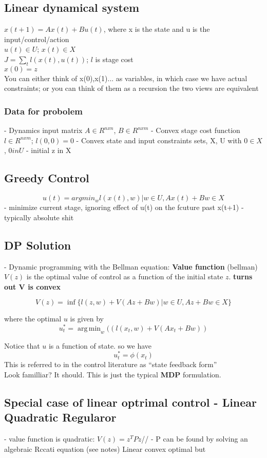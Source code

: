 \documentclass[11pt]{article}
\DeclareMathOperator*{\argmin}{arg\,min}
\begin{document}
\subsection{Linear dynamical system}
$x(t+1) = Ax(t) + Bu(t)$, where x is the state and u is the input/control/action\\
$u(t) \in U$; $x(t) \in X$\\
$J= \sum_{t} l(x(t), u(t))$; $l$ is stage cost\\
$x(0) = z$\\
You can either think of x(0),x(1)... as variables, in which case
we have actual constraints;
or you can think of them as a recursion
the two views are equivalent

\subsubsection{ Data for probolem}
- Dynamics input matrix $A \in R^{nxn}$, $B \in R^{nxm}$
- Convex stage cost function $l \in R^{nxm}$; $l(0,0)=0$
- Convex state and input constraints sets, X, U with $0\in X$, $0 in U$
- initial z in X

\subsection{ Greedy Control}
$$u(t) = argmin_w {l(x(t), w) | w \in U, Ax(t)+Bw \in X}$$
- minimize current stage, ignoring effect of u(t) on the fcuture past x(t+1)
- typically absolute shit

\subsection{DP Solution} - Dynamic programming with the Bellman equation:
\textbf{Value function} (bellman) $V(z)$ is the optimal value of control as a
function of the initial state $z$.
\textbf{turns out V is convex}

\[ V(z) = \inf{ \{ l(z,w)+V(Az+Bw) | w \in U,  Az+Bw \in X \} } \]

where the optimal $u$ is given by
\[ u^*_t = \argmin_w ((l(x_t, w) + V(Ax_t+Bw))\]

Notice that $u$ is a function of state. so we have
\[ u^*_t = \phi (x_t)\]
This is referred to in the control literature as ``state feedback form''\\

Look familliar? It should. This is just the typical \textbf{MDP} formulation.

\subsection{Special case of linear optrimal control - Linear Quadratic Regularor}
- value function is quadratic: $V(z) = z^TPz$//
- P can be found by solving an algebraic Rccati equation (see notes)
Linear convex optimal but
\end{document}
